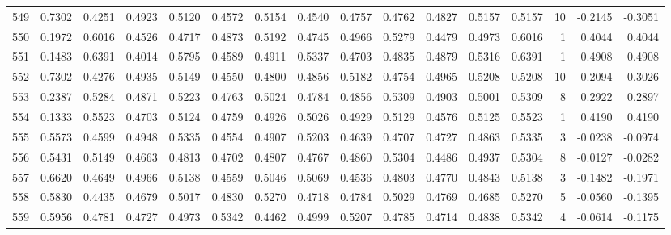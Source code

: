 \begin{tabular}{lrrrrrrrrrrrrrrr}
549 &      0.7302 &  0.4251 &  0.4923 &  0.5120 &  0.4572 &  0.5154 &  0.4540 &  0.4757 &  0.4762 &  0.4827 &   0.5157 &     0.5157 &     10 &                   -0.2145 &                    -0.3051 \\
550 &      0.1972 &  0.6016 &  0.4526 &  0.4717 &  0.4873 &  0.5192 &  0.4745 &  0.4966 &  0.5279 &  0.4479 &   0.4973 &     0.6016 &      1 &                    0.4044 &                     0.4044 \\
551 &      0.1483 &  0.6391 &  0.4014 &  0.5795 &  0.4589 &  0.4911 &  0.5337 &  0.4703 &  0.4835 &  0.4879 &   0.5316 &     0.6391 &      1 &                    0.4908 &                     0.4908 \\
552 &      0.7302 &  0.4276 &  0.4935 &  0.5149 &  0.4550 &  0.4800 &  0.4856 &  0.5182 &  0.4754 &  0.4965 &   0.5208 &     0.5208 &     10 &                   -0.2094 &                    -0.3026 \\
553 &      0.2387 &  0.5284 &  0.4871 &  0.5223 &  0.4763 &  0.5024 &  0.4784 &  0.4856 &  0.5309 &  0.4903 &   0.5001 &     0.5309 &      8 &                    0.2922 &                     0.2897 \\
554 &      0.1333 &  0.5523 &  0.4703 &  0.5124 &  0.4759 &  0.4926 &  0.5026 &  0.4929 &  0.5129 &  0.4576 &   0.5125 &     0.5523 &      1 &                    0.4190 &                     0.4190 \\
555 &      0.5573 &  0.4599 &  0.4948 &  0.5335 &  0.4554 &  0.4907 &  0.5203 &  0.4639 &  0.4707 &  0.4727 &   0.4863 &     0.5335 &      3 &                   -0.0238 &                    -0.0974 \\
556 &      0.5431 &  0.5149 &  0.4663 &  0.4813 &  0.4702 &  0.4807 &  0.4767 &  0.4860 &  0.5304 &  0.4486 &   0.4937 &     0.5304 &      8 &                   -0.0127 &                    -0.0282 \\
557 &      0.6620 &  0.4649 &  0.4966 &  0.5138 &  0.4559 &  0.5046 &  0.5069 &  0.4536 &  0.4803 &  0.4770 &   0.4843 &     0.5138 &      3 &                   -0.1482 &                    -0.1971 \\
558 &      0.5830 &  0.4435 &  0.4679 &  0.5017 &  0.4830 &  0.5270 &  0.4718 &  0.4784 &  0.5029 &  0.4769 &   0.4685 &     0.5270 &      5 &                   -0.0560 &                    -0.1395 \\
559 &      0.5956 &  0.4781 &  0.4727 &  0.4973 &  0.5342 &  0.4462 &  0.4999 &  0.5207 &  0.4785 &  0.4714 &   0.4838 &     0.5342 &      4 &                   -0.0614 &                    -0.1175 \\

\end{tabular}
